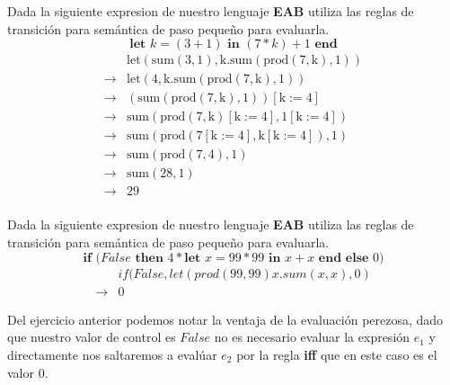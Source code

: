     \bigskip

    \begin{exercise}
        Dada la siguiente expresion de nuestro lenguaje \textbf{EAB} utiliza las reglas de transición para semántica de paso pequeño para evaluarla.
        \[
            \textbf{let } k = (3 + 1) \textbf{ in } (7 * k) + 1 \textbf{ end} 
        \]
        \[
            \begin{array}{cl}
                &\text{let}(\text{sum}(3,1),\text{k}.\text{sum}(\text{prod}(7,\text{k}),1))\\
                \to&\text{let}(4,\text{k}.\text{sum}(\text{prod}(7,\text{k}),1))\\
                \to&(\text{sum}(\text{prod}(7,\text{k}),1))[\text{k}:=4]\\
                \to&\text{sum}(\text{prod}(7,\text{k})[\text{k}:=4],1[\text{k}:=4])\\
                \to&\text{sum}(\text{prod}(7[\text{k}:=4],\text{k}[\text{k}:=4]),1)\\
                \to&\text{sum}(\text{prod}(7,4),1)\\
                \to&\text{sum}(28,1)\\
                \to&29\\
                

            \end{array}
        \]
        
    \end{exercise}

    \bigskip

    \begin{exercise}
        Dada la siguiente expresion de nuestro lenguaje \textbf{EAB} utiliza las reglas de transición para semántica de paso pequeño para evaluarla.
        \[
            \textbf{if (} False \textbf{ then } 4 * \textbf{let } x = 99 * 99 \textbf{ in } x + x \textbf{ end} \textbf{ else } 0 \textbf{)}
        \] 
        \[
            \begin{array}{cl}
                &if(False,let(prod(99,99)x.sum(x,x),0)\\
                \to&0

            \end{array}
        \]
    \end{exercise}

    Del ejercicio anterior podemos notar la ventaja de la evaluación perezosa, dado que nuestro valor de control es $False$ no es necesario evaluar la expresión $e_1$ y directamente nos saltaremos a evalúar $e_2$ por la regla \textbf{iff} que en este caso es el valor 0.\\
    
